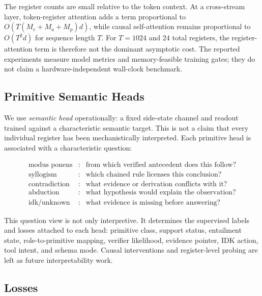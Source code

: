 The register counts are small relative to the token context. At a cross-stream
layer, token-register attention adds a term proportional to
$O(T(M_e+M_a+M_p)d)$, while causal self-attention remains proportional to
$O(T^2d)$ for sequence length $T$. For $T=1024$ and 24 total registers, the
register-attention term is therefore not the dominant asymptotic cost. The
reported experiments measure model metrics and memory-feasible training gates;
they do not claim a hardware-independent wall-clock benchmark.

\subsection{Primitive Semantic Heads}
\label{subsec:semantic_heads}

We use \emph{semantic head} operationally: a fixed side-state channel and
readout trained against a characteristic semantic target. This is not a claim
that every individual register has been mechanistically interpreted. Each
primitive head is associated with a characteristic question:

\begin{equation}
\begin{array}{lll}
\text{modus ponens} &:& \text{from which verified antecedent does this follow?}\\
\text{syllogism} &:& \text{which chained rule licenses this conclusion?}\\
\text{contradiction} &:& \text{what evidence or derivation conflicts with it?}\\
\text{abduction} &:& \text{what hypothesis would explain the observation?}\\
\text{idk/unknown} &:& \text{what evidence is missing before answering?}
\end{array}
\label{eq:primitive_questions}
\end{equation}

This question view is not only interpretive. It determines the supervised labels
and losses attached to each head: primitive class, support status, entailment
state, role-to-primitive mapping, verifier likelihood, evidence pointer, IDK
action, tool intent, and schema mode. Causal interventions and register-level
probing are left as future interpretability work.

\subsection{Losses}
\label{subsec:losses}

